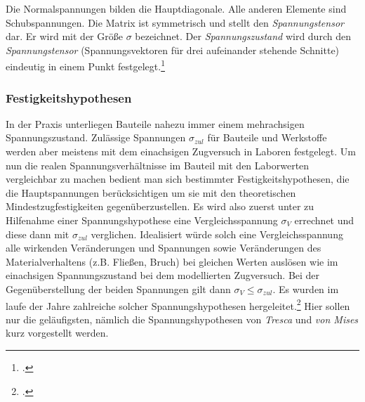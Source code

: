 \documentclass[12pt,a4paper,parskip]{scrartcl}
\begin{document}
{Die Normalspannungen bilden die Hauptdiagonale. Alle anderen Elemente sind Schubspannungen. Die Matrix ist symmetrisch und stellt den \emph{Spannungstensor} dar. Er wird mit der Größe $ \sigma $ bezeichnet. Der \emph{Spannungszustand} wird durch den \emph{Spannungstensor} (Spannungsvektoren für drei aufeinander stehende Schnitte) eindeutig in einem Punkt festgelegt.\footcite[Vgl.][43-46]{tmr}
\subsubsection{Festigkeitshypothesen}
In der Praxis unterliegen Bauteile nahezu immer einem mehrachsigen Spannungszustand. Zulässige Spannungen $ \sigma_{zul} $ für Bauteile und Werkstoffe werden aber meistens mit dem einachsigen Zugversuch in Laboren festgelegt. Um nun die realen Spannungsverhältnisse im Bauteil mit den Laborwerten vergleichbar zu machen bedient man sich bestimmter Festigkeitshypothesen, die die Hauptspannungen berücksichtigen um sie mit den theoretischen Mindestzugfestigkeiten gegenüberzustellen. Es wird also zuerst unter zu Hilfenahme einer Spannungshypothese eine Vergleichsspannung $ \sigma_V $ errechnet  und diese dann mit $ \sigma_{zul} $ verglichen. Idealisiert würde solch eine Vergleichsspannung alle wirkenden Veränderungen und Spannungen sowie Veränderungen des Materialverhaltens (z.B. Fließen, Bruch) bei gleichen Werten auslösen wie im einachsigen Spannungszustand bei dem modellierten Zugversuch. Bei der Gegenüberstellung der beiden Spannungen gilt dann $ \sigma_V \leq \sigma_{zul} $. Es wurden im laufe der Jahre zahlreiche solcher Spannungshypothesen hergeleitet.\footcite[Vgl.][399]{dd} Hier sollen nur die geläufigsten, nämlich die Spannungshypothesen von  \emph{Tresca} und \emph{von Mises} kurz vorgestellt werden.

}
\end{document}

